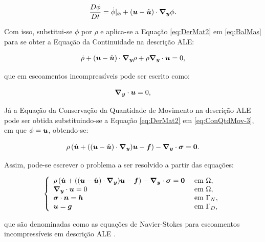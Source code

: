 \begin{equation}
    \frac{D\phi}{Dt}=\dot{\phi}|_{\hat{\boldsymbol{x}}}+(\boldsymbol{u}-\hat{\boldsymbol{u}})\cdot\boldsymbol{\nabla_y}\phi\text{.}
    \label{eq:DerMat2}
\end{equation}

Com isso, substitui-se $\phi$ por $\rho$ e aplica-se a Equação \eqref{eq:DerMat2} em \eqref{eq:BalMas} para se obter a Equação da Continuidade na descrição ALE:

\begin{equation}
    \dot{\rho}+(\boldsymbol{u}-\hat{\boldsymbol{u}})\cdot\boldsymbol{\nabla_y}\rho+\rho\boldsymbol{\nabla_y}\cdot\boldsymbol{u}=0\text{,}
\end{equation}

\noindent que em escoamentos incompressíveis pode ser escrito como:

\begin{equation}
    \boldsymbol{\nabla_y}\cdot\boldsymbol{u}=0\text{,}
    \label{eq:ALE-cont}
\end{equation}

Já a Equação da Conservação da Quantidade de Movimento na descrição ALE pode ser obtida substituindo-se a Equação \eqref{eq:DerMat2} em \eqref{eq:ConQtdMov-3}, em que $\mathbf{\phi}=\boldsymbol{u}$, obtendo-se:

\begin{equation}
    \rho\left({\dot{\boldsymbol{u}}+((\boldsymbol{u}-\hat{\boldsymbol{u}})\cdot\boldsymbol{\nabla_y})\boldsymbol{u}-\boldsymbol{f}}\right)-\boldsymbol{\nabla_y}\cdot\boldsymbol{\sigma}=\boldsymbol{0}\text{.}
    \label{eq:ALE-mov}
\end{equation}

Assim, pode-se escrever o problema a ser resolvido a partir das equações:

\begin{equation}
    \left\{
    \begin{array}{ll}
        \rho\left({\dot{\boldsymbol{u}}+((\boldsymbol{u}-\hat{\boldsymbol{u}})\cdot\boldsymbol{\nabla_y})\boldsymbol{u}-\boldsymbol{f}}\right)-\boldsymbol{\nabla_y}\cdot\boldsymbol{\sigma}=\boldsymbol{0} & \text{ em }\Omega\text{,}   \\
        \boldsymbol{\nabla_y}\cdot\boldsymbol{u}=0                                                                       & \text{ em }\Omega\text{,}   \\
        \boldsymbol{\sigma}\cdot\boldsymbol{n}=\boldsymbol{h}                                                                & \text{ em }\Gamma_N\text{,} \\
        \boldsymbol{u}=\boldsymbol{g}                                                                          & \text{ em }\Gamma_D\text{,}
    \end{array}
    \right.
    \label{eq:NS-ALE}
\end{equation}

\noindent que são denominadas como as equações de Navier-Stokes para escoamentos incompressíveis em descrição ALE \cite{bazilevs2013computational}.

